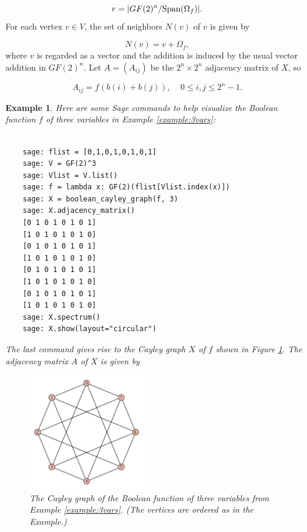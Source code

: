 \documentclass[12pt]{article}
\newcommand{\dgreen}{\color{dgreencolor}\bf}
\newcommand{\SAGE}{{\dgreen {\sf Sage}}\xspace}
\newcommand{\sage}{\SAGE}
\newtheorem{example}[theorem]{Example}
\begin{document}
\[
r = |GF(2)^n/{\rm Span}(\Omega_f)|.
\]
For each vertex $v\in V$, the set of neighbors $N(v)$ of $v$ is given
by

\[
N(v)=v+\Omega_f,
\]
where $v$ is regarded as a vector and the addition is induced by the
usual vector addition in $GF(2)^n$.
Let $A = (A_{ij})$ be the $2^n\times 2^n$ adjacency matrix of
$X$, so

\[
A_{ij} = f(b(i)+b(j)),
\ \ \ \ \ 0\leq i,j\leq 2^n-1.
\]

\begin{example}
\label{example:3vars-graph}
Here are some Sage commands to help visualize the
Boolean function $f$ of three variables in
Example \ref{example:3vars}:


\begin{Verbatim}[fontsize=\scriptsize,fontfamily=courier,fontshape=tt,frame=single,label=\sage]

    sage: flist = [0,1,0,1,0,1,0,1]
    sage: V = GF(2)^3
    sage: Vlist = V.list()
    sage: f = lambda x: GF(2)(flist[Vlist.index(x)])
    sage: X = boolean_cayley_graph(f, 3)
    sage: X.adjacency_matrix()
    [0 1 0 1 0 1 0 1]
    [1 0 1 0 1 0 1 0]
    [0 1 0 1 0 1 0 1]
    [1 0 1 0 1 0 1 0]
    [0 1 0 1 0 1 0 1]
    [1 0 1 0 1 0 1 0]
    [0 1 0 1 0 1 0 1]
    [1 0 1 0 1 0 1 0]
    sage: X.spectrum()
    sage: X.show(layout="circular")

\end{Verbatim}

The last command gives rise to the Cayley graph $X$ of $f$ shown in
Figure \ref{fig:monotone-boolean-fcns-3vars-graph}.
The adjacency matrix $A$ of $X$ is given by

\begin{figure}[t!]
\begin{minipage}{\textwidth}
\begin{center}
\includegraphics[height=5cm,width=5cm]{monotone-boolean-fcns-3vars-graph}
\end{center}
\end{minipage}
\caption{The Cayley graph of the Boolean function of three
  variables from Example \ref{example:3vars}. (The vertices are
  ordered as in the Example.)}
\label{fig:monotone-boolean-fcns-3vars-graph}
\end{figure}




\end{example}
\end{document}
